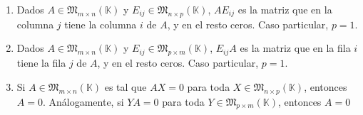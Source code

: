 \begin{proposition}
	\begin{enumerate}
		\item Dados \(A \in \mathfrak{M}_{m \times n}(\mathbb{K}) \) y \(E_{ij} \in \mathfrak{M}_{n \times p}(\mathbb{K}) \), \(AE_{ij}\) es la matriz que en la columna \(j \) tiene la columna \(i \) de \(A \), y en el resto ceros. Caso particular, \(p =1 \).
		\item Dados \(A \in  \mathfrak{M}_{m \times n}(\mathbb{K}) \) y \(E_{ij} \in  \mathfrak{M}_{p \times m}(\mathbb{K}) \), \(E_{ij}A \) es la matriz que en la fila \(i \) tiene la fila \(j \) de \(A \), y en el resto ceros. Caso particular, \(p = 1\).
		\item Si \(A \in \mathfrak{M}_{m \times n}(\mathbb{K}) \) es tal que \(AX = 0 \) para toda \(X \in \mathfrak{M}_{n \times p}(\mathbb{K}) \), entonces \(A = 0 \). Análogamente, si \(YA = 0 \) para toda \(Y \in  \mathfrak{M}_{p \times m}(\mathbb{K}) \), entonces \(A = 0\)
	\end{enumerate}
\end{proposition}

